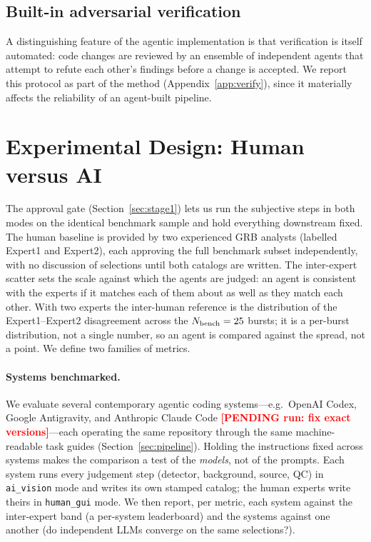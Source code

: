 \documentclass[twocolumn]{aastex631}
\newcommand{\PENDING}[1]{\textbf{\textcolor{red}{[PENDING run: #1]}}}
\begin{document}
\subsection{Built-in adversarial verification}
A distinguishing feature of the agentic implementation is that verification is
itself automated: code changes are reviewed by an ensemble of independent agents
that attempt to refute each other's findings before a change is accepted. We report
this protocol as part of the method (Appendix~\ref{app:verify}), since it
materially affects the reliability of an agent-built pipeline.

\section{Experimental Design: Human versus AI} \label{sec:design}
The approval gate (Section~\ref{sec:stage1}) lets us run the subjective steps in
both modes on the identical benchmark sample and hold everything downstream fixed.
The human baseline is provided by two experienced GRB analysts (labelled Expert1 and
Expert2), each approving the full benchmark subset independently, with no discussion
of selections until both catalogs are written. The inter-expert scatter sets the
scale against which the agents are judged: an agent is consistent with the experts if
it matches each of them about as well as they match each other. With two experts the
inter-human reference is the distribution of the Expert1--Expert2 disagreement across
the $N_{\rm bench}=25$ bursts; it is a per-burst distribution, not a single number,
so an agent is compared against the spread, not a point. We define two families of
metrics.

\paragraph{Systems benchmarked.} We evaluate several contemporary agentic coding
systems---e.g.\ OpenAI Codex, Google Antigravity, and Anthropic Claude Code
\PENDING{fix exact versions}---each operating the same repository through the same
machine-readable task guides (Section~\ref{sec:pipeline}). Holding the instructions
fixed across systems makes the comparison a test of the \emph{models}, not of the
prompts. Each system runs every judgement step (detector, background, source, QC) in
\texttt{ai\_vision} mode and writes its own stamped catalog; the human experts write
theirs in \texttt{human\_gui} mode. We then report, per metric, each system against
the inter-expert band (a per-system leaderboard) and the systems against one another
(do independent LLMs converge on the same selections?).
\end{document}
